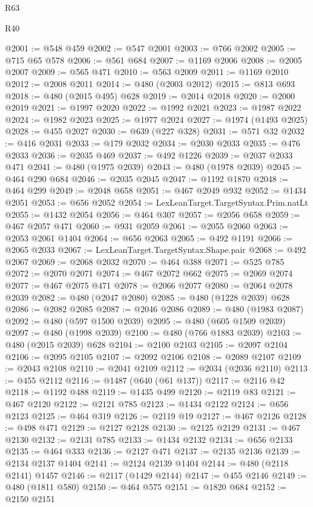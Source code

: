 \begin{lexlean}{R63}
\begin{lexlean}{R40}
\begin{coremodule}
{{{{{{{{{{{{{{{{{{{{{{{{{{{{{{{{{{{{{{{{{{{{{{{{{{{{{{{{{{{{{{{{{{{{{{{{{{{{{{{{{{{{{{{{{{{{{{{{{{{{{{{{{{{{{@2001 := @548 @459
@2002 := @547 @2001
@2003 := @766 @2002
@2005 := @715 @65 @578
@2006 := @561 @684
@2007 := @1169 @2006
@2008 := @2005 @2007
@2009 := @565 @471
@2010 := @563 @2009
@2011 := @1169 @2010
@2012 := @2008 @2011
@2014 := @480 (@2003 @2012)
@2015 := @813 @693
@2018 := @480 (@2015 @495) @628
@2019 := @2014 @2018
@2020 := @2000 @2019
@2021 := @1997 @2020
@2022 := @1992 @2021
@2023 := @1987 @2022
@2024 := @1982 @2023
@2025 := @1977 @2024
@2027 := @1974 (@1493 @2025)
@2028 := @455 @2027
@2030 := @639 (@227 @328)
@2031 := @571 @32
@2032 := @416 @2031
@2033 := @179 @2032
@2034 := @2030 @2033
@2035 := @476 @2033
@2036 := @2035 @469
@2037 := @492 @1226
@2039 := @2037 @2033 @471
@2041 := @480 (@1975 @2039)
@2043 := @480 (@1978 @2039)
@2045 := @464 @290 @684
@2046 := @2035 @2045
@2047 := @1192 @1870
@2048 := @464 @299
@2049 := @2048 @658
@2051 := @467 @2049 @932
@2052 := @1434 @2051
@2053 := @656 @2052
@2054 := LexLeanTarget.TargetSyntax.Prim.natLt
@2055 := @1432 @2054
@2056 := @464 @307
@2057 := @2056 @658
@2059 := @467 @2057 @471
@2060 := @931 @2059
@2061 := @2055 @2060
@2063 := @2053 @2061 @1404
@2064 := @656 @2063
@2065 := @492 @1191
@2066 := @2065 @2033
@2067 := LexLeanTarget.TargetSyntax.Shape.pair
@2068 := @492 @2067
@2069 := @2068 @2032
@2070 := @464 @388
@2071 := @525 @785
@2072 := @2070 @2071
@2074 := @467 @2072 @662
@2075 := @2069 @2074
@2077 := @467 @2075 @471
@2078 := @2066 @2077
@2080 := @2064 @2078 @2039
@2082 := @480 (@2047 @2080)
@2085 := @480 (@1228 @2039) @628
@2086 := @2082 @2085
@2087 := @2046 @2086
@2089 := @480 (@1983 @2087)
@2092 := @480 (@597 @1500 @2039)
@2095 := @480 (@605 @1509 @2039)
@2097 := @480 (@1998 @2039)
@2100 := @480 (@766 @1883 @2039)
@2103 := @480 (@2015 @2039) @628
@2104 := @2100 @2103
@2105 := @2097 @2104
@2106 := @2095 @2105
@2107 := @2092 @2106
@2108 := @2089 @2107
@2109 := @2043 @2108
@2110 := @2041 @2109
@2112 := @2034 (@2036 @2110)
@2113 := @455 @2112
@2116 := @1487 (@640 (@61 @137))
@2117 := @2116 @42
@2118 := @1192 @488
@2119 := @1435 @499
@2120 := @2119 @83
@2121 := @467 @2120
@2122 := @2121 @785
@2123 := @1434 @2122
@2124 := @656 @2123
@2125 := @464 @319
@2126 := @2119 @19
@2127 := @467 @2126
@2128 := @498 @471
@2129 := @2127 @2128
@2130 := @2125 @2129
@2131 := @467 @2130
@2132 := @2131 @785
@2133 := @1434 @2132
@2134 := @656 @2133
@2135 := @464 @333
@2136 := @2127 @471
@2137 := @2135 @2136
@2139 := @2134 @2137 @1404
@2141 := @2124 @2139 @1404
@2144 := @480 (@2118 @2141) @1457
@2146 := @2117 (@1429 @2144)
@2147 := @455 @2146
@2149 := @480 (@1811 @580)
@2150 := @464 @575
@2151 := @1820 @684
@2152 := @2150 @2151
}}}}}}}}}}}}}}}}}}}}}}}}}}}}}}}}}}}}}}}}}}}}}}}}}}}}}}}}}}}}}}}}}}}}}}}}}}}}}}}}}}}}}}}}}}}}}}}}}}}}}}}}}}}}}
\end{coremodule}
\end{lexlean}
\end{lexlean}
